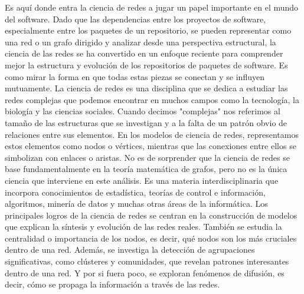 Es aquí donde entra la ciencia de redes a jugar un papel importante en el mundo del software.
Dado que las dependencias entre los proyectos de software, especialmente entre los paquetes de un repositorio,
se pueden representar como una red o un grafo dirigido y analizar desde una perspectiva estructural, la ciencia de
las redes se ha convertido en un enfoque reciente para comprender mejor la estructura y evolución \cite{7962360} \cite{8998991} de los
repositorios de paquetes de software. Es como mirar la forma en que todas estas piezas se conectan y se influyen mutuamente.
La ciencia de redes es una disciplina que se dedica a estudiar las redes complejas que podemos encontrar en muchos campos como la tecnología,
la biología y las ciencias sociales. Cuando decimos "complejas" nos referimos al tamaño de las estructuras que se investigan y a la
falta de un patrón obvio de relaciones entre sus elementos. En los modelos de ciencia de redes, representamos estos elementos como nodos o vértices, mientras que las conexiones entre ellos se simbolizan con enlaces o aristas.
No es de sorprender que la ciencia de redes se base fundamentalmente en la teoría matemática de grafos, pero no es la única ciencia que
interviene en este análisis.
Es una materia interdisciplinaria que incorpora conocimientos de estadística, teorías de control e información, algoritmos,
minería de datos y muchas otras áreas de la informática.
Los principales logros de la ciencia de redes se centran en la construcción de modelos que explican la síntesis y evolución de las redes reales.
También se estudia la centralidad o importancia de los nodos, es decir, qué nodos son los más cruciales dentro de una red.
Además, se investiga la detección de agrupaciones significativas, como clústeres y comunidades, que revelan patrones interesantes dentro de una red.
Y por si fuera poco, se exploran fenómenos de difusión, es decir, cómo se propaga la información a través de las redes.



